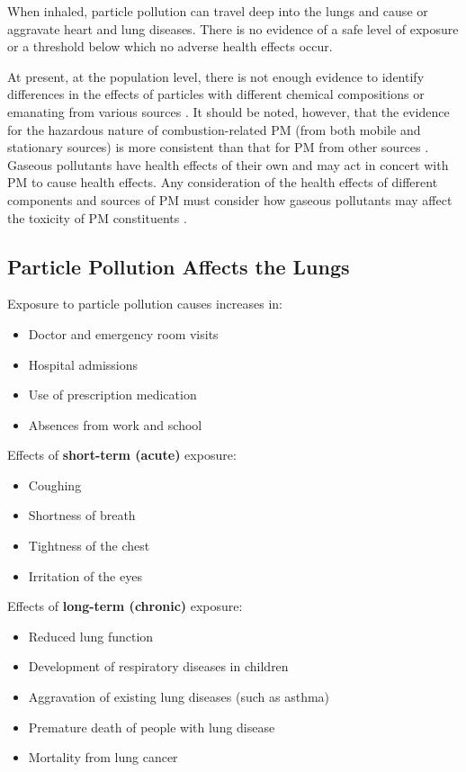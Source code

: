 \documentclass[11pt]{article}
\begin{document}
When inhaled, particle pollution can travel deep into the lungs and cause or aggravate heart and lung diseases. There is no evidence of a safe level of exposure or a threshold below which no adverse health effects occur.

At present, at the population level, there is not enough evidence to identify differences in the effects of particles with different chemical compositions or emanating from various sources \citep{stanek2011attributing}. It should be noted, however, that the evidence for the hazardous nature of combustion-related PM (from both mobile and stationary sources) is more consistent than that for PM from other sources \citep{world2007health}. Gaseous pollutants have health effects of their own and may act in concert with PM to cause health effects. Any consideration of the health effects of different components and sources of PM must consider how gaseous pollutants may affect the toxicity of PM constituents \citep{adams2015particulate}.

\subsection{Particle Pollution Affects the Lungs}

Exposure to particle pollution causes increases in:
\begin{itemize}
    \item Doctor and emergency room visits
    \item Hospital admissions
    \item Use of prescription medication
    \item Absences from work and school
\end{itemize}

Effects of \textbf{short-term (acute)} exposure:
\begin{itemize}
    \item Coughing
    \item Shortness of breath
    \item Tightness of the chest
    \item Irritation of the eyes
\end{itemize}

Effects of \textbf{long-term (chronic)} exposure:
\begin{itemize}
    \item Reduced lung function
    \item Development of respiratory diseases in children
    \item Aggravation of existing lung diseases (such as asthma)
    \item Premature death of people with lung disease
    \item Mortality from lung cancer
\end{itemize}
\end{document}
